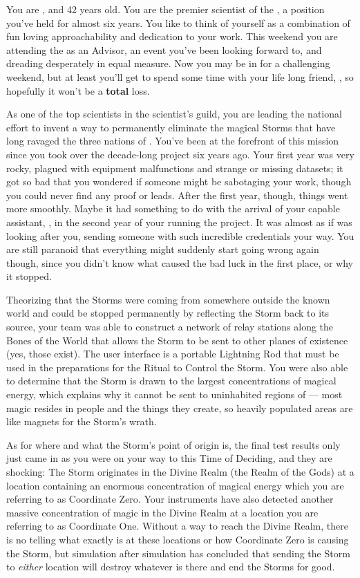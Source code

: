 \documentclass[char]{GL2020}
\begin{document}
\name{\cHeadScientist{}}

You are \cHeadScientist{\intro}, and 42 years old. You are the premier scientist of the \pTech{}, a position you've held for almost six years. You like to think of yourself as a combination of fun loving approachability and dedication to your work. This weekend you are attending the \pSchool{} as an Advisor, an event you've been looking forward to, and dreading desperately in equal measure. Now you may be in for a challenging weekend, but at least you'll get to spend some time with your life long friend, \cChupInventor{\full}, so hopefully it won’t be a \textbf{total} loss.

As one of the top scientists in the \pTech{} scientist's guild, you are leading the national effort to invent a way to permanently eliminate the magical Storms that have long ravaged the three nations of \pEarth{}.  You've been at the forefront of this mission since you took over the decade-long project six years ago. Your first year was very rocky, plagued with equipment malfunctions and strange or missing datasets; it got so bad that you wondered if someone might be sabotaging your work, though you could never find any proof or leads. After the first year, though, things went more smoothly. Maybe it had something to do with the arrival of your capable assistant, \cAssistantScientist{\full}, in the second year of your running the project. It was almost as if \cTechGod{} was looking after you, sending someone with such incredible credentials your way. You are still paranoid that everything might suddenly start going wrong again though, since you didn’t know what caused the bad luck in the first place, or why it stopped.

Theorizing that the Storms were coming from somewhere outside the known world and could be stopped permanently by reflecting the Storm back to its source, your team was able to construct a network of relay stations along the Bones of the World that allows the Storm to be sent to other planes of existence (yes, those exist). The user interface is a portable Lightning Rod that must be used in the preparations for the Ritual to Control the Storm. You were also able to determine that the Storm is drawn to the largest concentrations of magical energy, which explains why it cannot be sent to uninhabited regions of \pEarth{} — most magic resides in people and the things they create, so heavily populated areas are like magnets for the Storm’s wrath. 

As for where and what the Storm’s point of origin is, the final test results only just came in as you were on your way to this Time of Deciding, and they are shocking: The Storm originates in the Divine Realm (the Realm of the Gods) at a location containing an enormous concentration of magical energy which you are referring to as Coordinate Zero. Your instruments have also detected another massive concentration of magic in the Divine Realm at a location you are referring to as Coordinate One. Without a way to reach the Divine Realm, there is no telling what exactly is at these locations or how Coordinate Zero is causing the Storm, but simulation after simulation has concluded that sending the Storm to \emph{either} location will destroy whatever is there and end the Storms for good.
\end{document}
